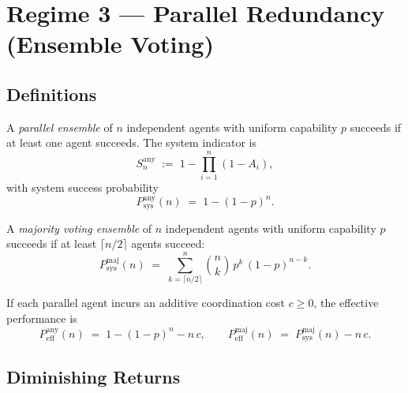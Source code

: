 \section{Regime 3 --- Parallel Redundancy (Ensemble Voting)}
\label{sec:regime3}


\subsection{Definitions}

\begin{definition}
\label{def:parallel-any}
A \emph{parallel ensemble} of $n$ independent agents with uniform capability $p$ succeeds
if at least one agent succeeds. The system indicator is
\[
  S_n^{\mathrm{any}} \;:=\; 1 - \prod_{i=1}^{n}(1 - A_i),
\]
with system success probability
\[
  P_{\mathrm{sys}}^{\mathrm{any}}(n) \;=\; 1 - (1-p)^n.
\]
\end{definition}

\begin{definition}
\label{def:parallel-majority}
A \emph{majority voting ensemble} of $n$ independent agents with uniform capability $p$
succeeds if at least $\lceil n/2 \rceil$ agents succeed:
\[
  P_{\mathrm{sys}}^{\mathrm{maj}}(n) \;=\; \sum_{k=\lceil n/2 \rceil}^{n} \binom{n}{k}\, p^k\, (1-p)^{n-k}.
\]
\end{definition}

\begin{definition}
\label{def:parallel-peff}
If each parallel agent incurs an additive coordination cost $c \ge 0$, the effective
performance is
\[
  P_{\mathrm{eff}}^{\mathrm{any}}(n) \;=\; 1 - (1-p)^n - n\,c,
  \qquad
  P_{\mathrm{eff}}^{\mathrm{maj}}(n) \;=\; P_{\mathrm{sys}}^{\mathrm{maj}}(n) - n\,c.
\]
\end{definition}

\subsection{Diminishing Returns}

